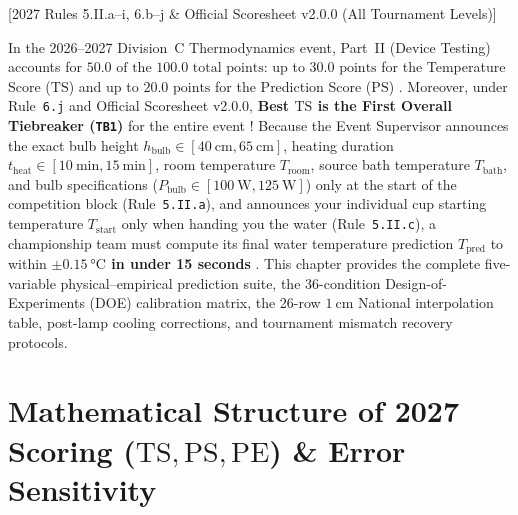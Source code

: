 [2027 Rules 5.II.a--i, 6.b--j \& Official Scoresheet v2.0.0 (All Tournament Levels)]

In the 2026--2027 Division~C Thermodynamics event, Part~II (Device Testing) accounts for \textbf{$50.0\text{ of the }100.0\text{ total points}$}: up to \textbf{$30.0\text{ points}$} for the Temperature Score ($\mathrm{TS}$) and up to \textbf{$20.0\text{ points}$} for the Prediction Score ($\mathrm{PS}$) . Moreover, under Rule~\texttt{6.j} and Official Scoresheet v2.0.0, \textbf{Best $\mathrm{TS}$ is the First Overall Tiebreaker (\texttt{TB1})} for the entire event ! Because the Event Supervisor announces the exact bulb height $h_{\mathrm{bulb}} \in [\SI{40}{\centi\meter}, \SI{65}{\centi\meter}]$, heating duration $t_{\mathrm{heat}} \in [\SI{10}{\minute}, \SI{15}{\minute}]$, room temperature $T_{\mathrm{room}}$, source bath temperature $T_{\mathrm{bath}}$, and bulb specifications ($P_{\mathrm{bulb}} \in [\SI{100}{\watt}, \SI{125}{\watt}]$) only at the start of the competition block (Rule~\texttt{5.II.a}), and announces your individual cup starting temperature $T_{\mathrm{start}}$ only when handing you the water (Rule~\texttt{5.II.c}), a championship team must compute its final water temperature prediction $T_{\mathrm{pred}}$ to within \textbf{$\pm\SI{0.15}{\celsius}$ in under 15 seconds} . This chapter provides the complete five-variable physical--empirical prediction suite, the 36-condition Design-of-Experiments (DOE) calibration matrix, the 26-row $\SI{1}{\centi\meter}$ National interpolation table, post-lamp cooling corrections, and tournament mismatch recovery protocols.

\section{Mathematical Structure of 2027 Scoring (\texorpdfstring{$\mathrm{TS}, \mathrm{PS}, \mathrm{PE}$}{TS, PS, PE}) \& Error Sensitivity}\label{sec:16.1}

